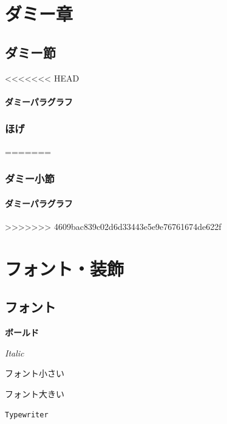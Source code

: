 \documentclass[11pt,a4paper, titlepage]{ltjsarticle}
\let\origsection\section
\let\origsubsection\subsection
\newcommand{\chapter}{\origsection}
\renewcommand{\section}{\origsubsection}
\renewcommand{\subsection}{\subsubsection}
\newcommand{\記}{\begin{center} 記 \end{center}}
\newcommand{\挨拶}{\noindent 拝啓 \ifcase\month\or 厳寒\or 春寒\or 早春
    \or 陽寒\or 新緑\or 向暑\or 猛暑\or 残暑\or 初秋\or 仲秋\or 晩秋\or 初冬
    \fi の候, ますますご清栄のこととお喜び申し上げます.}
\begin{document}
\chapter{ダミー章}
\lipsum[1-5]
\section{ダミー節 \label{sec:1}}
\lipsum[6-20]
<<<<<<< HEAD
\lipsum[21-25]
\paragraph{ダミーパラグラフ}
\lipsum[20]
\subsection{ほげ}
=======
\subsubsection{ダミー小節}
\lipsum[21-25]
\paragraph{ダミーパラグラフ}
\lipsum[20]
>>>>>>> 4609bac839c02d6d33443e5e9e76761674de622f

\chapter{フォント・装飾}
\section{フォント}
\textbf{ボールド} \par
\textit{Italic} \par
\small{フォント小さい} \par
\large{フォント大きい} \par
{} \par
\texttt{Typewriter} \par
{} \par
{} \par


\end{document}
